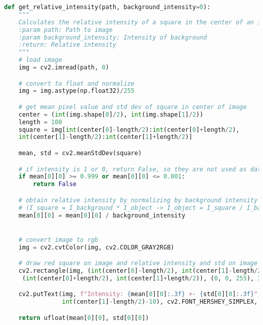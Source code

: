 \begin{lstlisting}[language = python, caption=Intensity Extraction Code, floatplacement=H]
    def get_relative_intensity(path, background_intensity=0):
    """
    Calculates the relative intensity of a square in the center of an image.
    :param path: Path to image
    :param background_intensity: Intensity of background
    :return: Relative intensity
    """
    # load image
    img = cv2.imread(path, 0)

    # convert to float and normalize
    img = img.astype(np.float32)/255

    # get mean pixel value and std dev of square in center of image
    center = (int(img.shape[0]/2), int(img.shape[1]/2))
    length = 100
    square = img[int(center[0]-length/2):int(center[0]+length/2), 
    int(center[1]-length/2):int(center[1]+length/2)]

    mean, std = cv2.meanStdDev(square)

    # if intensity is 1 or 0, return False, so they are not used as data points
    if mean[0][0] >= 0.999 or mean[0][0] <= 0.001:
        return False

    # obtain relative intensity by normalizing by background intensity
    # (I_square = I_background * I_object -> I_object = I_square / I_background)
    mean[0][0] = mean[0][0] / background_intensity


    # convert image to rgb
    img = cv2.cvtColor(img, cv2.COLOR_GRAY2RGB)

    # draw red square on image and relative intensity and std on image
    cv2.rectangle(img, (int(center[0]-length/2), int(center[1]-length/2)),
     (int(center[0]+length/2), int(center[1]+length/2)), (0, 0, 255), 3)

    cv2.putText(img, f"Intensity: {mean[0][0]:.3f} +- {std[0][0]:.3f}", (int(center[0]-length/2),
                int(center[1]-length/2)-10), cv2.FONT_HERSHEY_SIMPLEX, 1, (0, 0, 255), 2)

    return ufloat(mean[0][0], std[0][0])
\end{lstlisting}